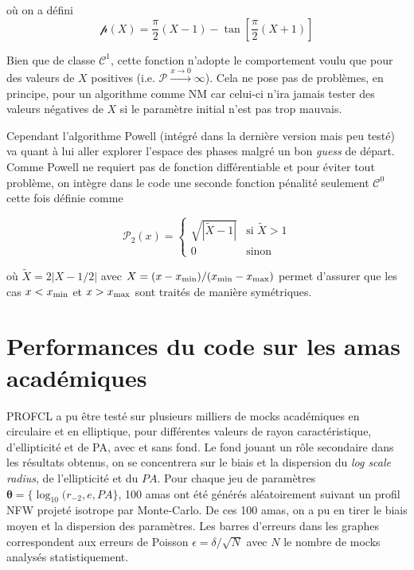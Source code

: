 \documentclass[a4paper,11pt]{article}
\numberwithin{equation}{section}
\begin{document}
  où on a défini
  \begin{equation}
    \mathcal{p} (X) = 
      \frac{\pi}{2} (X-1) - \tan \left [ \frac{\pi}{2} (X+1) \right ]
  \end{equation}
  
  Bien que de classe $\mathscr{C}^1$, cette fonction n'adopte le comportement voulu que pour des valeurs de $X$ positives (i.e. $\mathscr{P} \xrightarrow{x \rightarrow 0} \infty$). Cela ne pose pas de problèmes, en principe, pour un algorithme comme NM car celui-ci n'ira jamais tester des valeurs négatives de $X$ si le paramètre initial n'est pas trop mauvais.\par
  Cependant l'algorithme Powell (intégré dans la dernière version mais peu testé) va quant à lui aller explorer l'espace des phases malgré un bon \textit{guess} de départ. Comme Powell ne requiert pas de fonction différentiable et pour éviter tout problème, on intègre dans le code une seconde fonction pénalité seulement $\mathscr{C}^0$ cette fois définie comme
  
  \begin{equation}
    \mathscr{P}_2(x) = 
    \begin{cases}    
      \sqrt{|\tilde{X}-1|} & \mbox{si } \tilde{X} > 1\\
      0 & \mbox{sinon}
    \end{cases}
  \end{equation}
  
  où $\tilde{X} = 2 | X - 1/2 |$ avec $X = (x - x_{\rm{min}})/(x_{\rm{min}} - x_{\rm{max}})$ permet d'assurer que les cas $x < x_{\rm{min}}$ et $x > x_{\rm{max}}$ sont traités de manière symétriques.
  
  
  \newpage
  \section{Performances du code sur les amas académiques}
  
    PROFCL a pu être testé sur plusieurs milliers de mocks académiques en circulaire et en elliptique, pour différentes valeurs de rayon caractéristique, d'ellipticité et de PA, avec et sans fond. Le fond jouant un rôle secondaire dans les résultats obtenus, on se concentrera sur le biais et la dispersion du \textit{log scale radius}, de l'ellipticité et du $PA$. Pour chaque jeu de paramètres $\bm{\theta} = \lbrace \log_{10} (r_{-2} , e , PA \rbrace$, 100 amas ont été générés aléatoirement suivant un profil NFW projeté isotrope par Monte-Carlo. De ces 100 amas, on a pu en tirer le biais moyen et la dispersion des paramètres. Les barres d'erreurs dans les graphes correspondent aux erreurs de Poisson $\epsilon = \delta / \sqrt{N}$ avec $N$ le nombre de mocks analysés statistiquement.
  
\end{document}
